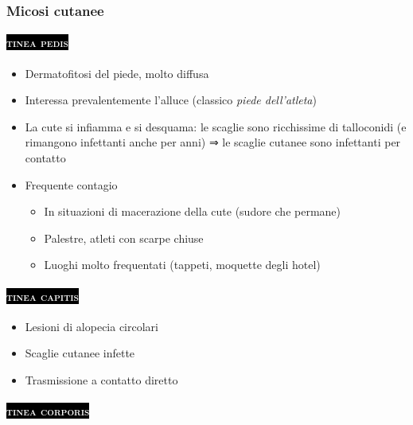 \documentclass[italian,]{article}
\providecommand{\tightlist}{%
  \setlength{\itemsep}{0pt}\setlength{\parskip}{0pt}}
\newcommand{\asidefigure}[2]{\marginpar{\phantom{Img:}\newline\texttt{[image: \#1]}\\\footnotesize\emph{#2}}}
\newcommand{\pat}[1]{\colorbox{black}{\textcolor{white}{\textsc{#1}}}}
\begin{document}
\hypertarget{micosi-cutanee}{%
\subsubsection{Micosi cutanee}\label{micosi-cutanee}}

\hypertarget{section-2}{%
\paragraph{\texorpdfstring{\pat{tinea pedis}}{}}\label{section-2}}

\begin{itemize}
\tightlist
\item
  Dermatofitosi del piede, molto diffusa
  \asidefigure{img/tinea-pedis.png}{}
\item
  Interessa prevalentemente l'alluce (classico \emph{piede dell'atleta})
\item
  La cute si infiamma e si desquama: le scaglie sono ricchissime di
  talloconidi (e rimangono infettanti anche per anni) ⇒ le scaglie
  cutanee sono infettanti per contatto
\item
  Frequente contagio

  \begin{itemize}
  \tightlist
  \item
    In situazioni di macerazione della cute (sudore che permane)
  \item
    Palestre, atleti con scarpe chiuse
  \item
    Luoghi molto frequentati (tappeti, moquette degli hotel)
  \end{itemize}
\end{itemize}

\hypertarget{section-3}{%
\paragraph{\texorpdfstring{\pat{tinea capitis}}{}}\label{section-3}}

\begin{itemize}
\tightlist
\item
  Lesioni di alopecia circolari
\item
  Scaglie cutanee infette
\item
  Trasmissione a contatto diretto
\end{itemize}

\hypertarget{section-4}{%
\paragraph{\texorpdfstring{\pat{tinea corporis}}{}}\label{section-4}}
\end{document}
